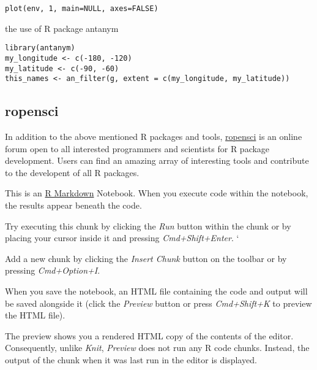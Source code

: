 \documentclass[]{article}
\begin{document}
\begin{verbatim}
plot(env, 1, main=NULL, axes=FALSE)
\end{verbatim}

the use of R package antanym

\begin{verbatim}
library(antanym)
my_longitude <- c(-180, -120)
my_latitude <- c(-90, -60)
this_names <- an_filter(g, extent = c(my_longitude, my_latitude))
\end{verbatim}

\subsection{ropensci}\label{ropensci}

In addition to the above mentioned R packages and tools,
\href{https://ropensci.org/}{ropensci} is an online forum open to all
interested programmers and scientists for R package development. Users
can find an amazing array of interesting tools and contribute to the
developent of all R packages.

This is an \href{http://rmarkdown.rstudio.com}{R Markdown} Notebook.
When you execute code within the notebook, the results appear beneath
the code.

Try executing this chunk by clicking the \emph{Run} button within the
chunk or by placing your cursor inside it and pressing
\emph{Cmd+Shift+Enter}. `

Add a new chunk by clicking the \emph{Insert Chunk} button on the
toolbar or by pressing \emph{Cmd+Option+I}.

When you save the notebook, an HTML file containing the code and output
will be saved alongside it (click the \emph{Preview} button or press
\emph{Cmd+Shift+K} to preview the HTML file).

The preview shows you a rendered HTML copy of the contents of the
editor. Consequently, unlike \emph{Knit}, \emph{Preview} does not run
any R code chunks. Instead, the output of the chunk when it was last run
in the editor is displayed.
\end{document}
